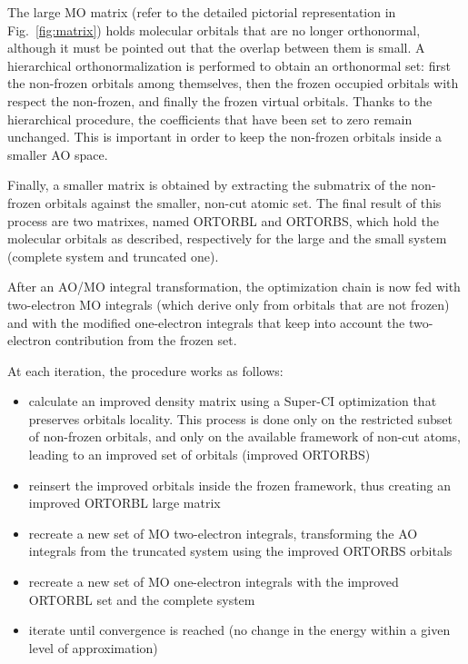 The large MO matrix (refer to the detailed pictorial representation in
Fig.~\ref{fig:matrix}) holds molecular orbitals that are no longer
orthonormal, although it must be pointed out that the overlap between them
is small. A hierarchical orthonormalization is performed to obtain an
orthonormal set: first the non-frozen orbitals among themselves, then the
frozen occupied orbitals with respect the non-frozen, and finally the frozen
virtual orbitals. Thanks to the hierarchical procedure, the coefficients
that have been set to zero remain unchanged. This is important in order to
keep the non-frozen orbitals inside a smaller AO space.

Finally, a smaller matrix is obtained by extracting the submatrix
of the non-frozen orbitals against the smaller, non-cut atomic set.
The final result of this process are two matrixes, named ORTORBL and
ORTORBS, which hold the molecular orbitals as described, respectively for
the large and the small system (complete system and truncated one).

After an AO/MO integral transformation, the optimization chain is now fed
with two-electron MO integrals (which derive only from orbitals
that are not frozen) and with the modified one-electron integrals that keep
into account the two-electron contribution from the frozen set. 

At each iteration, the procedure works as follows:
\begin{itemize}
\item calculate an improved density matrix using a Super-CI
optimization that preserves orbitals locality. This process is
done only on the restricted subset of non-frozen orbitals, and only on the
available framework of non-cut atoms, leading to an improved set
of orbitals (improved ORTORBS)
\item reinsert the improved orbitals inside the frozen framework, thus creating
an improved ORTORBL large matrix
\item recreate a new set of MO two-electron integrals, transforming the AO integrals
from the truncated system using the improved ORTORBS orbitals
\item recreate a new set of MO one-electron integrals with the improved ORTORBL set
and the complete system
\item iterate until convergence is reached (no change in the energy within a
given level of approximation)
\end{itemize}
